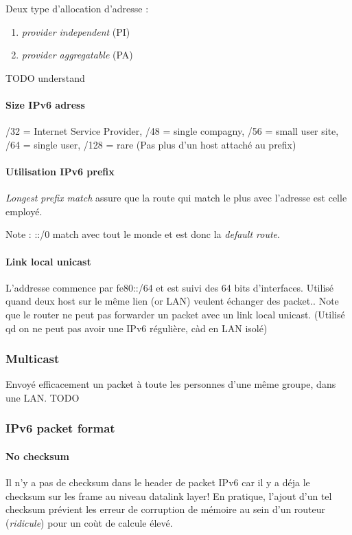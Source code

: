 \documentclass{report}
\begin{document}
Deux type d'allocation d'adresse :
\begin{enumerate}
    \item \textit{provider independent} (PI) 
    \item \textit{provider aggregatable} (PA) 
\end{enumerate}
TODO understand

\paragraph{Size IPv6 adress}
/32 = Internet Service Provider, /48 = single compagny, /56 = small user site,
/64 = single user, /128 = rare (Pas plus d'un host attaché au prefix)

\paragraph{Utilisation IPv6 prefix}
\textit{Longest prefix match} assure que la route qui match le plus avec
l'adresse est celle employé. 

Note : ::/0 match avec tout le monde et est donc la \textit{default route}.

\paragraph{Link local unicast}
L'addresse commence par fe80::/64 et est suivi des 64 bits d'interfaces.
Utilisé quand deux host sur le même lien (or LAN) veulent échanger des
packet.. Note que le router ne peut pas forwarder un packet avec un
link local unicast.
(Utilisé qd on ne peut pas avoir une IPv6 régulière, càd en LAN isolé)


\subsubsection{Multicast}
Envoyé efficacement un packet à toute les personnes d'une même groupe, dans une LAN.
TODO

\subsubsection{IPv6 packet format}

\paragraph{No checksum}
Il n'y a pas de checksum dans le header de packet IPv6 car il y a déja le checksum
sur les frame au niveau datalink layer! En pratique, l'ajout d'un tel checksum prévient
les erreur de corruption de mémoire au sein d'un routeur (\textit{ridicule}) pour un coùt de
calcule élevé.
\end{document}
